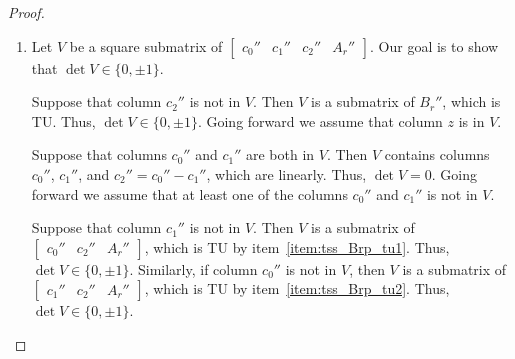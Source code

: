 \begin{proof}
\begin{enumerate}
        \item Let $V$ be a square submatrix of $\begin{bmatrix} c_{0}'' & c_{1}'' & c_{2}'' & A_{r}'' \end{bmatrix}$. Our goal is to show that $\det V \in \{0, \pm 1\}$.

        Suppose that column $c_{2}''$ is not in $V$. Then $V$ is a submatrix of $B_{r}''$, which is TU. Thus, $\det V \in \{0, \pm 1\}$. Going forward we assume that column $z$ is in $V$.

        Suppose that columns $c_{0}''$ and $c_{1}''$ are both in $V$. Then $V$ contains columns $c_{0}''$, $c_{1}''$, and $c_{2}'' = c_{0}'' - c_{1}''$, which are linearly. Thus, $\det V = 0$. Going forward we assume that at least one of the columns $c_{0}''$ and $c_{1}''$ is not in $V$.

        Suppose that column $c_{1}''$ is not in $V$. Then $V$ is a submatrix of $\begin{bmatrix} c_{0}'' & c_{2}'' & A_{r}'' \end{bmatrix}$, which is TU by item~\ref{item:tss_Brp_tu1}. Thus, $\det V \in \{0, \pm 1\}$. Similarly, if column $c_{0}''$ is not in $V$, then $V$ is a submatrix of $\begin{bmatrix} c_{1}'' & c_{2}'' & A_{r}'' \end{bmatrix}$, which is TU by item~\ref{item:tss_Brp_tu2}. Thus, $\det V \in \{0, \pm 1\}$.

    \end{enumerate}
\end{proof}

